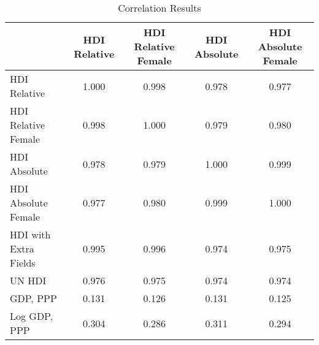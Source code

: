 \begin{table}[H]
    \footnotesize
\caption{Correlation Results}
\begin{tabular}{lcccc}
\toprule
 & HDI Relative & HDI Relative Female & HDI Absolute & HDI Absolute Female \\
\midrule
HDI Relative & 1.000 & 0.998 & 0.978 & 0.977 \\
HDI Relative Female & 0.998 & 1.000 & 0.979 & 0.980 \\
HDI Absolute & 0.978 & 0.979 & 1.000 & 0.999 \\
HDI Absolute Female & 0.977 & 0.980 & 0.999 & 1.000 \\
HDI with Extra Fields & 0.995 & 0.996 & 0.974 & 0.975 \\
UN HDI & 0.976 & 0.975 & 0.974 & 0.974 \\
GDP, PPP & 0.131 & 0.126 & 0.131 & 0.125 \\
Log GDP, PPP & 0.304 & 0.286 & 0.311 & 0.294 \\
\bottomrule
\end{tabular}
\end{table}
